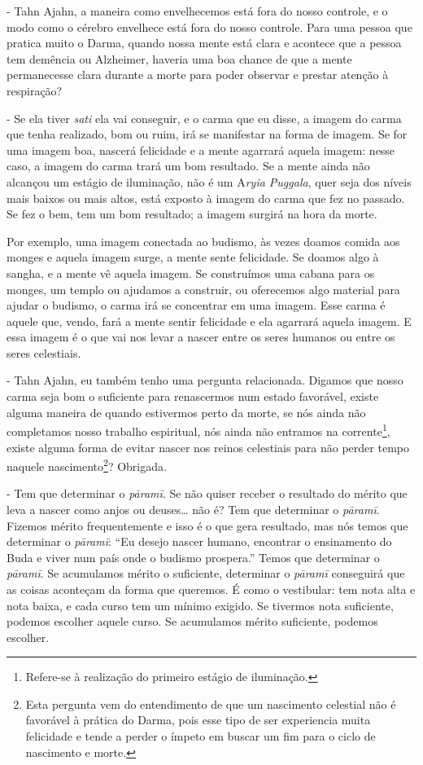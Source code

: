 - Tahn Ajahn, a maneira como envelhecemos está fora do nosso
controle, e o modo como o cérebro envelhece está fora do nosso
controle. Para uma pessoa que pratica muito o Darma, quando nossa mente
está clara e acontece que a pessoa tem demência ou Alzheimer, haveria
uma boa chance de que a mente permanecesse clara durante a morte para
poder observar e prestar atenção à respiração?

- Se ela tiver \textit{sati }ela vai conseguir, e o carma que eu
disse, a imagem do carma que tenha realizado, bom ou ruim, irá se
manifestar na forma de imagem. Se for uma imagem boa, nascerá
felicidade e a mente agarrará aquela imagem: nesse caso, a imagem do
carma trará um bom resultado. Se a mente ainda não alcançou um estágio
de iluminação, não é um A\textit{ryia Puggala}, quer seja dos níveis
mais baixos ou mais altos, está exposto à imagem do carma que fez no
passado. Se fez o bem, tem um bom resultado; a imagem surgirá na hora
da morte.

Por exemplo, uma imagem conectada ao budismo, às vezes doamos comida
aos monges e aquela imagem surge, a mente sente felicidade. Se doamos
algo à sangha, e a mente vê aquela imagem. Se construímos uma cabana
para os monges, um templo ou ajudamos a construir, ou oferecemos algo
material para ajudar o budismo, o carma irá se concentrar em uma
imagem. Esse carma é aquele que, vendo, fará a mente sentir felicidade
e ela agarrará aquela imagem. E essa imagem é o que vai nos levar a
nascer entre os seres humanos ou entre os seres celestiais.

- Tahn Ajahn, eu também tenho uma pergunta relacionada. Digamos
que nosso carma seja bom o suficiente para renascermos num estado
favorável, existe alguma maneira de quando estivermos perto da morte,
se nós ainda não completamos nosso trabalho espiritual, nós ainda não
entramos na corrente\footnote{Refere-se à realização do primeiro
estágio de iluminação.}, existe alguma forma de evitar nascer nos
reinos celestiais para não perder tempo naquele
nascimento\footnote{Esta pergunta vem do entendimento de que um
nascimento celestial não é favorável à prática do Darma, pois esse tipo
de ser experiencia muita felicidade e tende a perder o ímpeto em buscar
um fim para o ciclo de nascimento e morte.}? Obrigada.

- Tem que determinar o \textit{pāramī}. Se não quiser receber
o resultado do mérito que leva a nascer como anjos ou deuses…
não é? Tem que determinar o \textit{pāramī}. Fizemos mérito
frequentemente e isso é o que gera resultado, mas nós temos que
determinar o \textit{pāramī}: “Eu desejo nascer humano, encontrar
o ensinamento do Buda e viver num país onde o budismo prospera.” Temos
que determinar o \textit{pāramī}. Se acumulamos mérito o
suficiente, determinar o \textit{pāramī }conseguirá que as coisas
aconteçam da forma que queremos. É como o vestibular: tem nota alta e
nota baixa, e cada curso tem um mínimo exigido. Se tivermos nota
suficiente, podemos escolher aquele curso. Se acumulamos mérito
suficiente, podemos escolher.


